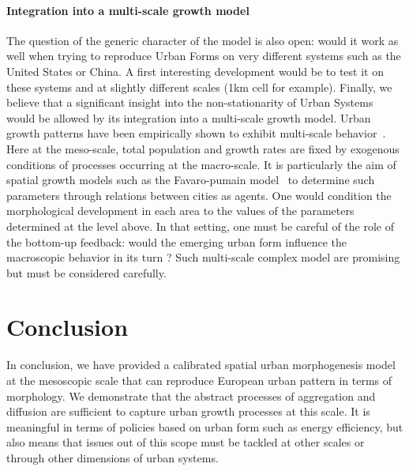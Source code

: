 \documentclass[10pt,letterpaper]{article}
\begin{document}
\paragraph{Integration into a multi-scale growth model}

The question of the generic character of the model is also open: would it work as well when trying to reproduce Urban Forms on very different systems such as the United States or China. A first interesting development would be to test it on these systems and at slightly different scales (1km cell for example). Finally, we believe that a significant insight into the non-stationarity of Urban Systems would be allowed by its integration into a multi-scale growth model. Urban growth patterns have been empirically shown to exhibit multi-scale behavior~\cite{zhang2013identifying}. Here at the meso-scale, total population and growth rates are fixed by exogenous conditions of processes occurring at the macro-scale. It is particularly the aim of spatial growth models such as the Favaro-pumain model~\cite{favaro2011gibrat} to determine such parameters through relations between cities as agents. One would condition the morphological development in each area to the values of the parameters determined at the level above. In that setting, one must be careful of the role of the bottom-up feedback: would the emerging urban form influence the macroscopic behavior in its turn ? Such multi-scale complex model are promising but must be considered carefully.


\section*{Conclusion}


In conclusion, we have provided a calibrated spatial urban morphogenesis model at the mesoscopic scale that can reproduce  European urban pattern in terms of morphology. We demonstrate that the abstract processes of aggregation and diffusion are sufficient to capture urban growth processes at this scale. It is meaningful in terms of policies based on urban form such as energy efficiency, but also means that issues out of this scope must be tackled at other scales or through other dimensions of urban systems.




\end{document}
